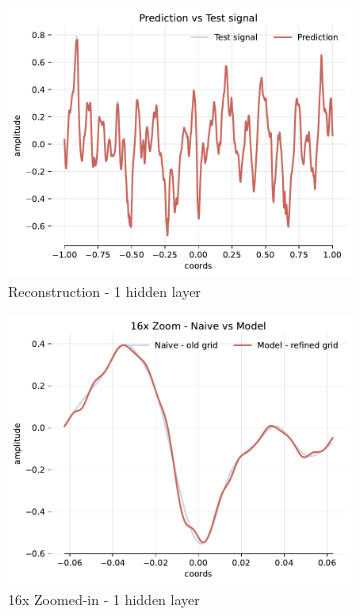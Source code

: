 \begin{figure}[!h]
    \begin{subfigure}[b]{0.32\textwidth}
        \centering
        \includegraphics[width=\textwidth]{img/ch3/pred-64hf-1hl-32w-sub3.pdf}
        \caption{Reconstruction - 1 hidden layer}
    \end{subfigure}
    \begin{subfigure}[b]{0.32\textwidth}
        \centering
        \includegraphics[width=\textwidth]{img/ch3/16x-64hf-1hl-32w-sub3.pdf}
        \caption{16x Zoomed-in - 1 hidden layer}
    \end{subfigure}
    \begin{subfigure}[b]{0.32\textwidth}

\end{subfigure}
\end{figure}
